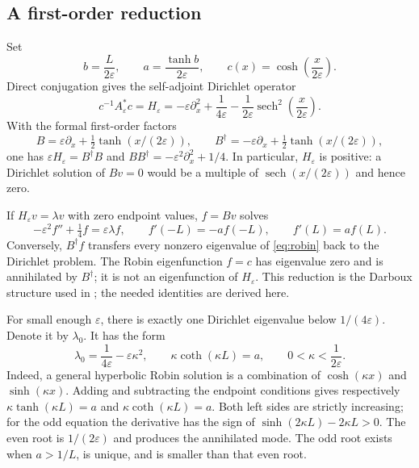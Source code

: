 \documentclass[11pt]{article}
\numberwithin{equation}{section}
\newcommand{\eps}{\varepsilon}
\newcommand{\sech}{\operatorname{sech}}
\begin{document}
\subsection{A first-order reduction}

Set
\[
 b=\frac{L}{2\eps},\qquad a=\frac{\tanh b}{2\eps},\qquad
 c(x)=\cosh\!\left(\frac{x}{2\eps}\right).
\]
Direct conjugation gives the self-adjoint Dirichlet operator
\begin{equation}\label{eq:H}
 c^{-1}A_\eps^*c=H_\eps
 =-\eps\partial_x^2+\frac1{4\eps}
       -\frac1{2\eps}\sech^2\!\left(\frac{x}{2\eps}\right).
\end{equation}
With the formal first-order factors
\[
 B=\eps\partial_x+\tfrac12\tanh(x/(2\eps)),\qquad
 B^\dagger=-\eps\partial_x+\tfrac12\tanh(x/(2\eps)),
\]
one has $\eps H_\eps=B^\dagger B$ and
$BB^\dagger=-\eps^2\partial_x^2+1/4$.
In particular, $H_\eps$ is positive: a Dirichlet solution of $Bv=0$
would be a multiple of $\sech(x/(2\eps))$ and hence zero.

If $H_\eps v=\lambda v$ with zero endpoint values, $f=Bv$ solves
\begin{equation}\label{eq:robin}
 -\eps^2f''+\tfrac14f=\eps\lambda f,\qquad
 f'(-L)=-af(-L),\qquad f'(L)=af(L).
\end{equation}
Conversely, $B^\dagger f$ transfers every nonzero eigenvalue of
\eqref{eq:robin} back to the Dirichlet problem.
The Robin eigenfunction $f=c$ has eigenvalue zero and is annihilated by
$B^\dagger$; it is not an eigenfunction of $H_\eps$.
This reduction is the Darboux structure used in
\cite[Section 2]{Laheurte}; the needed identities are derived here.

For small enough $\eps$, there is exactly one Dirichlet eigenvalue below
$1/(4\eps)$. Denote it by $\lambda_0$. It has the form
\begin{equation}\label{eq:slow}
 \lambda_0=\frac1{4\eps}-\eps\kappa^2,\qquad
 \kappa\coth(\kappa L)=a,\qquad 0<\kappa<\frac1{2\eps}.
\end{equation}
Indeed, a general hyperbolic Robin solution is a combination of
$\cosh(\kappa x)$ and $\sinh(\kappa x)$. Adding and subtracting the
endpoint conditions gives respectively
$\kappa\tanh(\kappa L)=a$ and $\kappa\coth(\kappa L)=a$.
Both left sides are strictly increasing; for the odd equation the
derivative has the sign of $\sinh(2\kappa L)-2\kappa L>0$.
The even root is $1/(2\eps)$ and produces the annihilated mode.
The odd root exists when $a>1/L$, is unique, and is smaller than that
even root.
\end{document}
